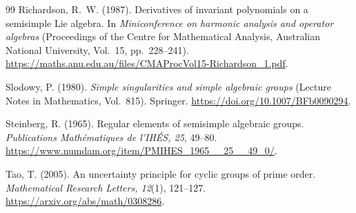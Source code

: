 \documentclass[11pt]{article}
\theoremstyle{definition}\newtheorem{definition}[theorem]{Definition}
\theoremstyle{remark}\newtheorem{remark}[theorem]{Remark}
\begin{document}
\begin{thebibliography}{99}
Richardson, R.~W. (1987). Derivatives of invariant polynomials on a semisimple Lie algebra.
In \emph{Miniconference on harmonic analysis and operator algebras} (Proceedings of the Centre for Mathematical Analysis, Australian National University, Vol.~15, pp.~228--241).
\url{https://maths.anu.edu.au/files/CMAProcVol15-Richardson_1.pdf}.

Slodowy, P. (1980). \emph{Simple singularities and simple algebraic groups} (Lecture Notes in Mathematics, Vol.~815). Springer.
\url{https://doi.org/10.1007/BFb0090294}.

Steinberg, R. (1965). Regular elements of semisimple algebraic groups.
\emph{Publications Math\'ematiques de l'IH\'ES, 25}, 49--80.
\url{https://www.numdam.org/item/PMIHES_1965__25__49_0/}.

Tao, T. (2005). An uncertainty principle for cyclic groups of prime order.
\emph{Mathematical Research Letters, 12}(1), 121--127.
\url{https://arxiv.org/abs/math/0308286}.
\end{thebibliography}
\end{document}
